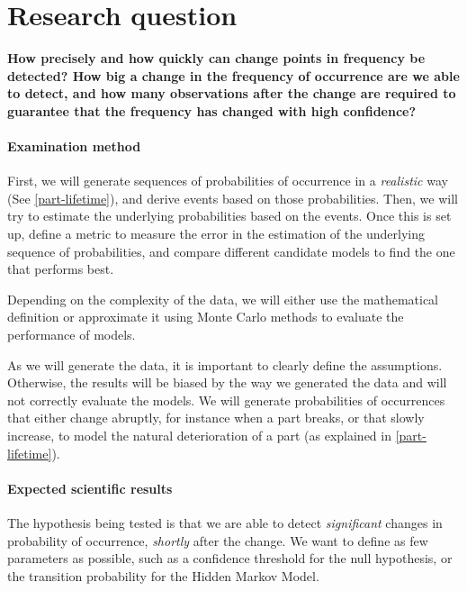 \documentclass{kththesis}
\begin{document}
\section{Research question}

\textbf{How precisely and how quickly can change points in frequency be detected?
How big a change in the frequency of occurrence are we able to detect, and how many observations after the change are required to guarantee that the frequency has changed with high confidence?}

\medskip

\paragraph*{Examination method}

First, we will generate sequences of probabilities of occurrence in a \emph{realistic} way (See \ref{part-lifetime}), and derive events based on those probabilities.
Then, we will try to estimate the underlying probabilities based on the events.
Once this is set up, define a metric to measure the error in the estimation of the underlying sequence of probabilities, and compare different candidate models to find the one that performs best.

Depending on the complexity of the data, we will either use the mathematical definition or approximate it using Monte Carlo methods to evaluate the performance of models.

\medskip

As we will generate the data, it is important to clearly define the assumptions.
Otherwise, the results will be biased by the way we generated the data and will not correctly evaluate the models.
We will generate probabilities of occurrences that either change abruptly, for instance when a part breaks, or that slowly increase, to model the natural deterioration of a part (as explained in \ref{part-lifetime}).


\paragraph*{Expected scientific results}

The hypothesis being tested is that we are able to detect \emph{significant} changes in probability of occurrence, \emph{shortly} after the change. 
We want to define as few parameters as possible, such as a confidence threshold for the null hypothesis, or the transition probability for the Hidden Markov Model.
\end{document}
